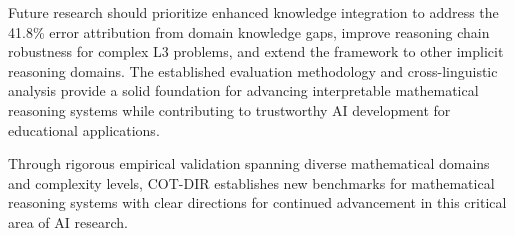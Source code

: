 Future research should prioritize enhanced knowledge integration to address the 41.8\% error attribution from domain knowledge gaps, improve reasoning chain robustness for complex L3 problems, and extend the framework to other implicit reasoning domains. The established evaluation methodology and cross-linguistic analysis provide a solid foundation for advancing interpretable mathematical reasoning systems while contributing to trustworthy AI development for educational applications.

Through rigorous empirical validation spanning diverse mathematical domains and complexity levels, COT-DIR establishes new benchmarks for mathematical reasoning systems with clear directions for continued advancement in this critical area of AI research. 